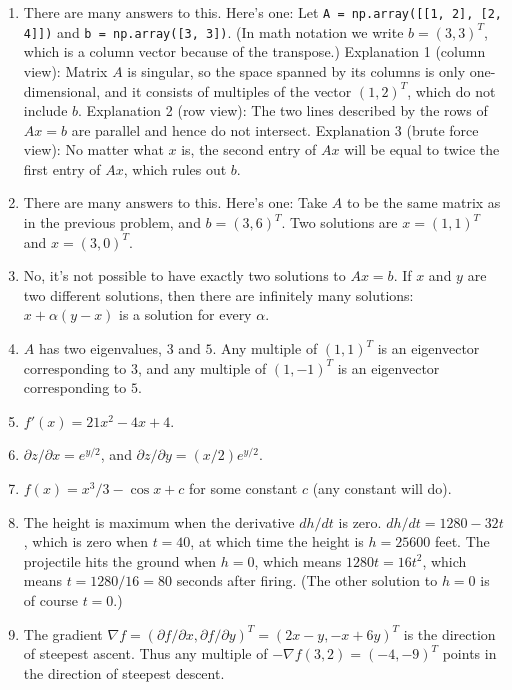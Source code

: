 \documentclass[11pt]{article}
\begin{document}
\begin{enumerate}
\item
There are many answers to this.  Here's one:
Let {\tt A = np.array([[1, 2], [2, 4]])} 
and {\tt b = np.array([3, 3])}.
(In math notation we write $b=(3,3)^T$, 
which is a column vector because of the transpose.)
Explanation 1 (column view): 
Matrix $A$ is singular, so the space spanned
by its columns is only one-dimensional, and it consists of
multiples of the vector $(1,2)^T$, which do not include $b$.
Explanation 2 (row view):
The two lines described by the rows of $Ax=b$ are parallel
and hence do not intersect.
Explanation 3 (brute force view):
No matter what $x$ is, the second entry of $Ax$ will be equal
to twice the first entry of $Ax$, which rules out $b$.

\item
There are many answers to this.  Here's one:
Take $A$ to be the same matrix as in the previous problem,
and $b = (3,6)^T$.
Two solutions are $x = (1,1)^T$ and $x = (3,0)^T$.

\item
No, it's not possible to have exactly two solutions to $Ax=b$.
If $x$ and $y$ are two different solutions, then there are
infinitely many solutions: $x + \alpha(y-x)$ is a solution
for every $\alpha$.

\item
$A$ has two eigenvalues, $3$ and $5$.
Any multiple of $(1,1)^T$ is an eigenvector corresponding to $3$,
and any multiple of $(1,-1)^T$ is an eigenvector corresponding to $5$.

\item
$f'(x)=21x^2-4x+4$.

\item
$\partial z / \partial x = e^{y/2}$, and
$\partial z / \partial y = (x/2)e^{y/2}$.

\item
$f(x) = x^3/3 - \cos x + c$ for some constant $c$ (any constant will do).

\item
The height is maximum when the derivative $dh/dt$ is zero.
$dh/dt = 1280-32t$, which is zero when $t = 40$, 
at which time the height is $h = 25600$ feet.
The projectile hits the ground when $h=0$,
which means $1280t = 16t^2$, which means $t=1280/16 = 80$ seconds after
firing.
(The other solution to $h=0$ is of course $t=0$.)

\item
The gradient $\nabla f 
= (\partial f / \partial x, \partial f / \partial y)^T
= (2x-y, -x+6y)^T$
is the direction of steepest ascent.
Thus any multiple of $-\nabla f(3,2) = (-4,-9)^T$ 
points in the direction of steepest descent.

\end{enumerate}
\end{document}
